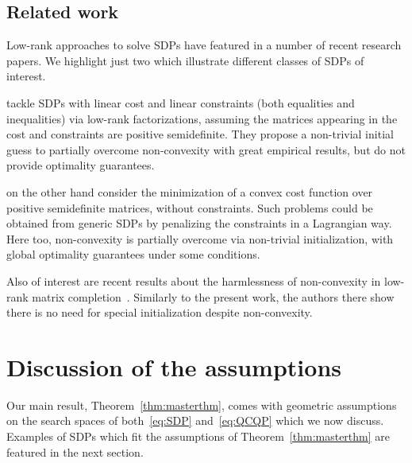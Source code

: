\documentclass{article}
\newcommand{\1}{\mathbf{1}}
\begin{document}
\subsection*{Related work}

Low-rank approaches to solve SDPs have featured in a number of recent research papers. We highlight just two which illustrate different classes of SDPs of interest.

\citet{shah2016biconvex} tackle SDPs with linear cost and linear constraints (both equalities and inequalities) via low-rank factorizations, assuming the matrices appearing in the cost and constraints are positive semidefinite. They propose a non-trivial initial guess to partially overcome non-convexity with great empirical results, but do not provide optimality guarantees.

\citet{bhojanapalli2016dropping} on the other hand consider the minimization of a convex cost function over positive semidefinite matrices, without constraints. Such problems could be obtained from generic SDPs by penalizing the constraints in a Lagrangian way. Here too, non-convexity is partially overcome via non-trivial initialization, with global optimality guarantees under some conditions.

Also of interest are recent results about the harmlessness of non-convexity in low-rank matrix completion~\citep{ge2016matrix,bhojanapalli2016global}. Similarly to the present work, the authors there show there is no need for special initialization despite non-convexity.






\section{Discussion of the assumptions}

Our main result, Theorem~\ref{thm:masterthm}, comes with geometric assumptions on the search spaces of both~\eqref{eq:SDP} and~\eqref{eq:QCQP}
which we now discuss. Examples of SDPs which fit the assumptions of Theorem~\ref{thm:masterthm} are featured in the next section.
\end{document}
